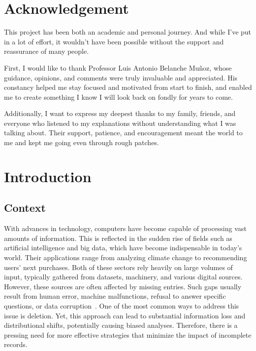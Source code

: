 \documentclass[a4paper,12pt]{article}
\begin{document}
\section*{Acknowledgement}
This project has been both an academic and personal journey. And while I've put in a lot of effort, it wouldn't have been possible without the support and reassurance of many people.

First, I would like to thank Professor Luis Antonio Belanche Muñoz, whose guidance, opinions, and comments were truly invaluable and appreciated. His constancy helped me stay focused and motivated from start to finish, and enabled me to create something I know I will look back on fondly for years to come.

Additionally, I want to express my deepest thanks to my family, friends, and everyone who listened to my explanations without understanding what I was talking about. Their support, patience, and encouragement meant the world to me and kept me going even through rough patches.
\newpage
\section{Introduction}

\subsection{Context}
With advances in technology, computers have become capable of processing vast amounts of information. This is reflected in the sudden rise of fields such as artificial intelligence and big data, which have become indispensable in today's world. Their applications range from analyzing climate change to recommending users' next purchases. Both of these sectors rely heavily on large volumes of input, typically gathered from datasets, machinery, and various digital sources.\\

However, these sources are often affected by missing entries. Such gaps usually result from human error, machine malfunctions, refusal to answer specific questions, or data corruption~\cite{1}. One of the most common ways to address this issue is deletion. Yet, this approach can lead to substantial information loss and distributional shifts, potentially causing biased analyses. Therefore, there is a pressing need for more effective strategies that minimize the impact of incomplete records.
\end{document}
